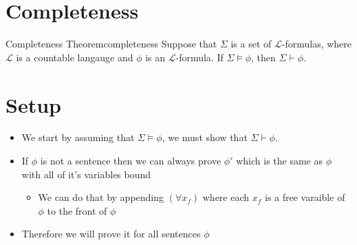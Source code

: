 \section{Completeness}

\begin{theorem}{Completeness Theorem}{completeness}
Suppose that $\Sigma$ is a set of $\mathcal{L}$-formulas, where $ \mathcal{L}$ is a countable langauge  and $\phi$ is an $\mathcal{L}$-formula. If $\Sigma \models \phi$, then $\Sigma \vdash \phi$.

\section*{Setup}

\begin{itemize}
    \item We start by assuming that $ \Sigma \models \phi$, we must show that $ \Sigma \vdash \phi$.
    \item If $ \phi$ is not a sentence then we can always prove $ \phi'$ which is the same as $ \phi$ with all of it's variables bound
    \begin{itemize}
        \item We can do that by appending $ \left( \forall  x _{f}  \right)$ where each $ x_{f}$  is a free varaible of $ \phi$ to the front of $ \phi$ 
    \end{itemize}
\item Therefore we will prove it for all sentences $ \phi$ %
\end{itemize}

\end{theorem}
